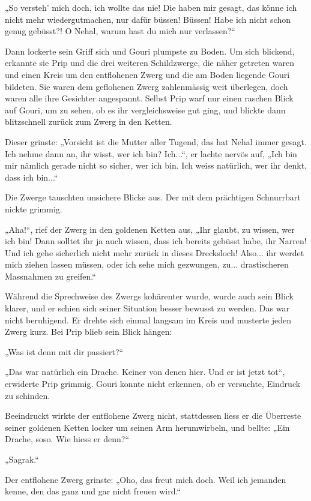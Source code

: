„So versteh’ mich doch, ich wollte das nie! Die haben mir gesagt, das könne ich nicht mehr wiedergutmachen, nur dafür büssen! Büssen! Habe ich nicht schon genug gebüsst?! O Nehal, warum hast du mich nur verlassen?“

Dann lockerte sein Griff sich und Gouri plumpste zu Boden. Um sich blickend, erkannte sie Prip und die drei weiteren Schildzwerge, die näher getreten waren und einen Kreis um den entflohenen Zwerg und die am Boden liegende Gouri bildeten. Sie waren dem geflohenen Zwerg zahlenmässig weit überlegen, doch waren alle ihre Gesichter angespannt. Selbst Prip warf nur einen raschen Blick auf Gouri, um zu sehen, ob es ihr vergleichsweise gut ging, und blickte dann blitzschnell zurück zum Zwerg in den Ketten.

Dieser grinste: „Vorsicht ist die Mutter aller Tugend, das hat Nehal immer gesagt. Ich nehme dann an, ihr wisst, wer ich bin? Ich...“, er lachte nervös auf, „Ich bin mir nämlich gerade nicht so sicher, wer ich bin. Ich weiss natürlich, wer ihr denkt, dass ich bin...“

Die Zwerge tauschten unsichere Blicke aus. Der mit dem prächtigen Schnurrbart nickte grimmig.

„Aha!“, rief der Zwerg in den goldenen Ketten aus, „Ihr glaubt, zu wissen, wer ich bin! Dann solltet ihr ja auch wissen, dass ich bereits gebüsst habe, ihr Narren! Und ich gehe sicherlich nicht mehr zurück in dieses Drecksloch! Also... ihr werdet mich ziehen lassen müssen, oder ich sehe mich gezwungen, zu... drastischeren Massnahmen zu greifen.“

Während die Sprechweise des Zwergs kohärenter wurde, wurde auch sein Blick klarer, und er schien sich seiner Situation besser bewusst zu werden. Das war nicht beruhigend. Er drehte sich einmal langsam im Kreis und musterte jeden Zwerg kurz. Bei Prip blieb sein Blick hängen:

„Was ist denn mit dir passiert?“

„Das war natürlich ein Drache. Keiner von denen hier. Und er ist jetzt tot“, erwiderte Prip grimmig. Gouri konnte nicht erkennen, ob er versuchte, Eindruck zu schinden.

Beeindruckt wirkte der entflohene Zwerg nicht, stattdessen liess er die Überreste seiner goldenen Ketten locker um seinen Arm herumwirbeln, und bellte: „Ein Drache, soso. Wie hiess er denn?“

„Sagrak.“

Der entflohene Zwerg grinste: „Oho, das freut mich doch. Weil ich jemanden kenne, den das ganz und gar nicht freuen wird.“

